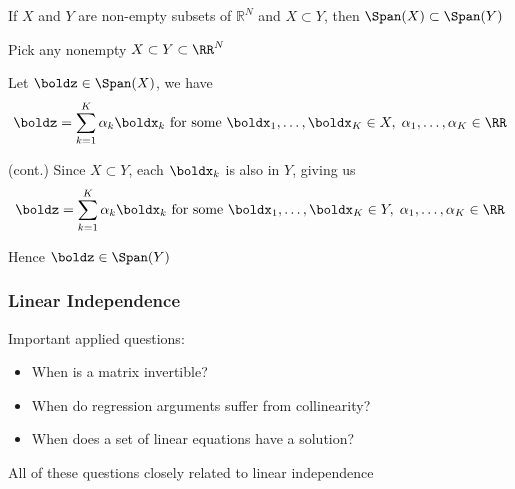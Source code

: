 \begin{frame}
    
    \vspace{2em}
    \Fact{\eqref{ET-fa:xsys}} 
    If $X$ and $Y$ are non-empty subsets of $\mathbb{R}^{N}$ and $X \subset Y$, 
    then $\Span(X) \subset \Span(Y)$
    \vspace{2em}
    
    \Prf
    Pick any nonempty $X \subset Y \subset \RR^N$
    
    Let $\boldz \in \Span(X)$, we have
    \begin{equation*}
        \boldz = \sum_{k=1}^K \alpha_k \boldx_k 
        \text{ for some }
        \boldx_1, \ldots, \boldx_K \in X, \; 
        \alpha_1, \ldots, \alpha_K \in \RR
    \end{equation*}
    
\end{frame}

\begin{frame}

   \vspace{2em}
    \Prf(cont.)
    Since $X \subset Y$, each $\boldx_k$ is also in $Y$, giving us
    \begin{equation*}
        \boldz = \sum_{k=1}^K \alpha_k \boldx_k 
        \text{ for some }
        \boldx_1, \ldots, \boldx_K \in Y, \; 
        \alpha_1, \ldots, \alpha_K \in \RR
    \end{equation*}

    \vspace{.7em}
    Hence $\boldz \in \Span(Y)$

\end{frame}


\begin{frame}
    \frametitle{Linear Independence}
    
    \vspace{2em}
    Important applied questions:

    \begin{itemize}
        \item When is a matrix invertible?
        \item When do regression arguments suffer from collinearity?
        \item When does a set of linear equations have a solution?
    \end{itemize}

    All of these questions closely related to linear independence 

\end{frame}


